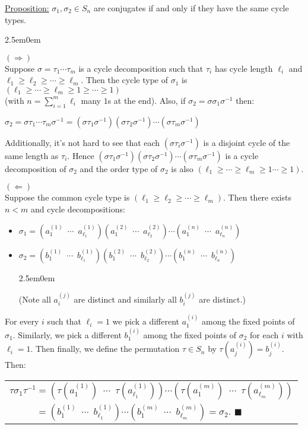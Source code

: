 \documentclass{book}
\newcommand{\myComment}{%
   \color{RawerSienna}%
   \fontsize{12}{14}\selectfont%
}
\newcommand{\exThreeP}{%
   \color{RedViolet}%
   \fontsize{12}{14}\selectfont%
}
\newenvironment{myIndent}{%
   \begin{adjustwidth}{2.5em}{0em}%
}{%
   \end{adjustwidth}%
}
\newcommand{\gap}{\phantom{2}}
\newcommand{\retTwo}{\hfill\bigbreak}
\begin{document}
\ul{Proposition:} $\sigma_1, \sigma_2 \in S_n$ are conjugates if and only if they have the same cycle types.

\begin{myIndent}\exThreeP
	$(\Longrightarrow)$\\
	Suppose $\sigma = \tau_1\cdots \tau_m$ is a cycle decomposition such that $\tau_i$ has cycle length $\ell_i$ and\\ $\ell_1 \geq \ell_2 \geq \cdots \geq \ell_m$. Then the cycle type of $\sigma_1$ is $(\ell_1 \geq \cdots \geq \ell_m \geq 1 \geq \cdots \geq 1)$\\ (with $n = \sum_{i=1}^m \ell_i$ many $1$s at the end). Also, if $\sigma_2 = \sigma \sigma_1 \sigma^{-1}$ then:

	{\centering $\sigma_2 = \sigma \tau_1 \cdots \tau_m \sigma^{-1} = (\sigma \tau_1 \sigma^{-1})(\sigma \tau_2 \sigma^{-1})\cdots(\sigma \tau_m \sigma^{-1})$ \retTwo\par}

	Additionally, it's not hard to see that each $(\sigma \tau_i \sigma^{-1})$ is a disjoint cycle of the same length as $\tau_i$. Hence $(\sigma \tau_1 \sigma^{-1})(\sigma \tau_2 \sigma^{-1})\cdots(\sigma \tau_m \sigma^{-1})$ is a cycle decomposition of $\sigma_2$ and the order type of $\sigma_2$ is also $(\ell_1 \geq \cdots \geq \ell_m \geq 1 \cdots \geq 1)$.\newpage

	$(\Longleftarrow)$\\
	Suppose the common cycle type is $(\ell_1 \geq \ell_2 \geq \cdots \geq \ell_m)$. Then there exists $n < m$ and cycle decompositions:
	\begin{itemize}
		\item $\sigma_1 = (a_1^{(1)}\gap\cdots\gap a_{\ell_1}^{(1)})(a_1^{(2)}\gap\cdots\gap a_{\ell_2}^{(2)})\cdots (a_1^{(n)}\gap\cdots \gap a_{\ell_n}^{(n)})$
		\item $\sigma_2 = (b_1^{(1)}\gap\cdots\gap b_{\ell_1}^{(1)})(b_1^{(2)}\gap\cdots\gap b_{\ell_2}^{(2)})\cdots (b_1^{(n)}\gap\cdots \gap b_{\ell_n}^{(n)})$
		\begin{myIndent}\myComment
			(Note all $a_i^{(j)}$ are distinct and similarly all $b_i^{(j)}$ are distinct.)\retTwo
		\end{myIndent}
	\end{itemize}

	For every $i$ such that $\ell_i = 1$ we pick a different $a_1^{(i)}$ among the fixed points of $\sigma_1$. Similarly, we pick a different $b_1^{(i)}$ among the fixed points of $\sigma_2$ for each $i$ with $\ell_i = 1$. Then finally, we define the permutation $\tau \in S_n$ by $\tau(a_j^{(i)}) = b_j^{(i)}$. Then:

	{\centering\begin{tabular}{l}
		$\tau \sigma_1 \tau^{-1} = (\tau(a_1^{(1)})\gap \cdots \gap \tau(a_{\ell_1}^{(1)}))\cdots(\tau(a_1^{(m)})\gap \cdots \gap \tau(a_{\ell_m}^{(m)}))$\\ [3pt]
		$\phantom{\tau \sigma_1 \tau^{-1}} = (b_1^{(1)} \gap \cdots \gap b_{\ell_1}^{(1)})\cdots(b_1^{(m)}\gap \cdots \gap b_{\ell_m}^{(m)}) = \sigma_2$. $\blacksquare$
	\end{tabular}\retTwo\par}
\end{myIndent}
\end{document}

